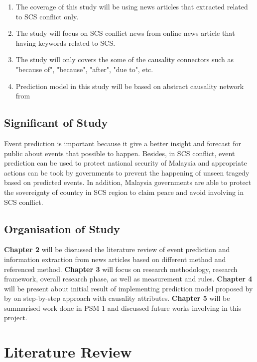 \documentclass[twoside]{utmthesis}
\begin{document}
\begin{enumerate}
\item The coverage of this study will be using news articles that extracted related to SCS conflict only. 
\item The study will focus on SCS conflict news from online news article that having keywords related to SCS. 
\item The study will only covers the some of the causality connectors such as "because of", "because", "after", "due to", etc.
\item Prediction model in this study will be based on abstract causality network from \cite{zhao2017constructing}
\end{enumerate}	

\section{Significant of Study}
Event prediction is important because it give a better insight and forecast for public about events that possible to happen. Besides, in SCS conflict, event prediction can be used to protect national security of Malaysia and appropriate actions can be took by governments to prevent the happening of unseen tragedy based on predicted events. In addition, Malaysia governments are able to protect the sovereignty of country in SCS region to claim peace and avoid involving in SCS conflict.    

\section{Organisation of Study}
\textbf{Chapter 2} will be discussed the literature review of event prediction and information extraction from news articles based on different method and referenced method. \textbf{Chapter 3} will focus on research methodology, research framework, overall research phase, as well as measurement and rules.  \textbf{Chapter 4} will be present about initial result of implementing prediction model proposed by \cite{zhao2017constructing} by on step-by-step approach with causality attributes. \textbf{Chapter 5} will be summarised work done in PSM 1 and discussed future works involving in this project.



\chapter{Literature Review}
\end{document}
